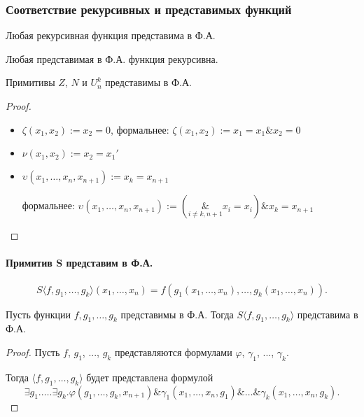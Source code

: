 \subsubsection{Соответствие рекурсивных и представимых функций}
\begin{theorem}Любая рекурсивная функция представима в Ф.А.\end{theorem}

\begin{theorem}Любая представимая в Ф.А. функция рекурсивна.\end{theorem}


\begin{theorem}
Примитивы $Z$, $N$ и $U^k_n$ представимы в Ф.А.
\end{theorem}

\begin{proof}
\begin{itemize}
\item $\zeta(x_1,x_2) := x_2=0$,  формальнее: $\zeta(x_1,x_2) := x_1=x_1 \& x_2=0$
\item $\nu(x_1,x_2) := x_2=x_1'$
\item $\upsilon(x_1,\dots,x_n,x_{n+1}) := x_k = x_{n+1}$  \vspace{0.1cm}

формальнее:
     $\upsilon(x_1,\dots,x_n,x_{n+1}) := (\underset{i\ne k,n+1}{\&} x_i=x_i) \& x_k = x_{n+1}$
\end{itemize}
\end{proof}


\paragraph{Примитив S представим в Ф.А.}

\[ S\langle f,g_1,\dots,g_k\rangle(x_1,\dots,x_n) = f(g_1(x_1,\dots,x_n),\dots,g_k(x_1,\dots,x_n)). \]

\begin{theorem}
Пусть функции $f,g_1,\dots,g_k$ представимы в Ф.А. Тогда $S\langle f,g_1,\dots,g_k \rangle$ представима в Ф.А.
\end{theorem}

\begin{proof}
Пусть $f$, $g_1$, ..., $g_k$ представляются формулами $\varphi$, $\gamma_1$, ..., $\gamma_k$.

Тогда
$\langle f,g_1,\dots,g_k\rangle$ будет представлена формулой
\[\exists g_1.\dots.\exists g_k.\varphi(g_1,\dots,g_k,x_{n+1})\&\gamma_1(x_1,\dots,x_n,g_1)\&\dots\&\gamma_k(x_1,\dots,x_n,g_k). \]
\end{proof}


